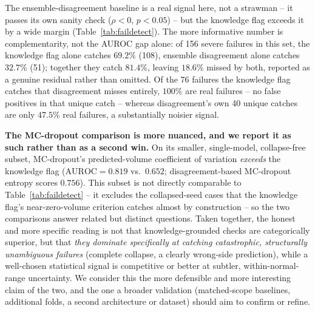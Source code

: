 The ensemble-disagreement baseline is a real signal here, not a strawman -- it passes its own sanity check ($\rho<0$, $p<0.05$) -- but the knowledge flag exceeds it by a wide margin (Table~\ref{tab:faildetect}). The more informative number is complementarity, not the AUROC gap alone: of 156 severe failures in this set, the knowledge flag alone catches $69.2\%$ (108), ensemble disagreement alone catches $32.7\%$ (51); together they catch $81.4\%$, leaving $18.6\%$ missed by both, reported as a genuine residual rather than omitted. Of the 76 failures the knowledge flag catches that disagreement misses entirely, $100\%$ are real failures -- no false positives in that unique catch -- whereas disagreement's own 40 unique catches are only $47.5\%$ real failures, a substantially noisier signal.

\textbf{The MC-dropout comparison is more nuanced, and we report it as such rather than as a second win.} On its smaller, single-model, collapse-free subset, MC-dropout's predicted-volume coefficient of variation \emph{exceeds} the knowledge flag ($\mathrm{AUROC}=0.819$ vs.\ $0.652$; disagreement-based MC-dropout entropy scores $0.756$). This subset is not directly comparable to Table~\ref{tab:faildetect} -- it excludes the collapsed-seed cases that the knowledge flag's near-zero-volume criterion catches almost by construction -- so the two comparisons answer related but distinct questions. Taken together, the honest and more specific reading is not that knowledge-grounded checks are categorically superior, but that \emph{they dominate specifically at catching catastrophic, structurally unambiguous failures} (complete collapse, a clearly wrong-side prediction), while a well-chosen statistical signal is competitive or better at subtler, within-normal-range uncertainty. We consider this the more defensible and more interesting claim of the two, and the one a broader validation (matched-scope baselines, additional folds, a second architecture or dataset) should aim to confirm or refine.




